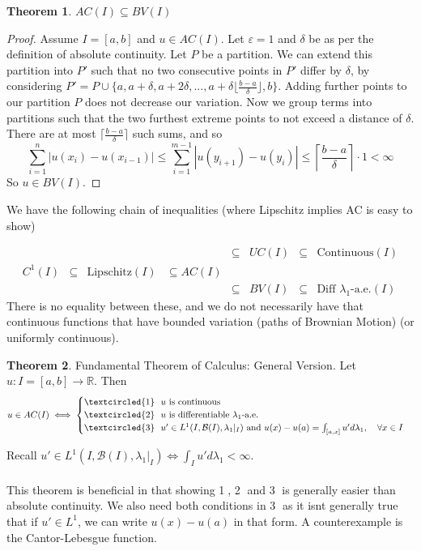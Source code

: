 \documentclass[11pt,a4paper]{article}
\theoremstyle{definition}
\newtheorem{theorem}{Theorem}[section]
\begin{document}
\begin{theorem}
    $AC(I) \subseteq BV(I)$
\end{theorem}

\begin{proof}
    Assume $I = [a,b]$ and $u \in AC(I)$. Let $\varepsilon = 1$ and $\delta$ be as per the definition of absolute continuity. Let $P$ be a partition. We can extend this partition into $P'$ such that no two consecutive points in $P'$ differ by $\delta$, by considering $P' = P \cup \{a, a+\delta, a+2\delta, ..., a + \delta \lfloor \frac{b-a}{\delta}\rfloor, b\}$. Adding further points to our partition $P$ does not decrease our variation. Now we group terms into partitions such that the two furthest extreme points to not exceed a distance of $\delta$. There are at most $\lceil \frac{b-a}{\delta}\rceil$ such sums, and so 
    \[
    \sum \limits _{i=1}^n |u(x_i) - u(x_{i-1})| \le \sum \limits _{i=1}^{m-1} |u(y_{i+1}) - u(y_i)| \le \left \lceil \frac{b-a}{\delta} \right \rceil \cdot 1 < \infty
    \]
    So $u \in BV(I)$.
\end{proof}

\noindent We have the following chain of inequalities (where Lipschitz implies AC is easy to show)

\[
\begin{array}{ccccccccc}
& & & & \subseteq & UC(I) & \subseteq & \text{Continuous}(I) \\
C^1 (I) & \subseteq & \text{Lipschitz}(I)   & \subseteq AC(I) \\ 
& & & & \subseteq & BV(I) & \subseteq & \text{Diff } \lambda_1\text{-a.e.}(I)
\end{array}
\]
\noindent There is no equality between these, and we do not necessarily have that continuous functions that have bounded variation (paths of Brownian Motion) (or uniformly continuous).

\begin{theorem}{Fundamental Theorem of Calculus: General Version}. Let $u: I = [a,b] \to \mathbb{R}$. Then
    \[
    u \in AC(I) \iff \begin{cases}
        \textcircled{1}\ \  u \text{ is continuous} \\
        \textcircled{2} \ \ u \text{ is differentiable } \lambda_1 \text{-a.e.} \\
        \textcircled{3} \ \ u' \in L^1 (I, \mathcal{B}(I), \lambda_1 | _{I}) \text{ and } u(x)-u(a) = \int _{[a,x]} u' d\lambda _1, \quad \forall x \in I
    \end{cases}
    \]
\end{theorem}
\noindent Recall $u' \in L^1(I, \mathcal{B}(I), \lambda_1 | _{I}) \iff \int _I u' d \lambda _1 < \infty$.
~\\~\\
This theorem is beneficial in that showing \textcircled{1}, \textcircled{2} and \textcircled{3} is generally easier than absolute continuity. We also need both conditions in \textcircled{3} as it isnt generally true that if $u' \in L^1$, we can write $u(x) - u(a)$ in that form. A counterexample is the Cantor-Lebesgue function.
\end{document}
